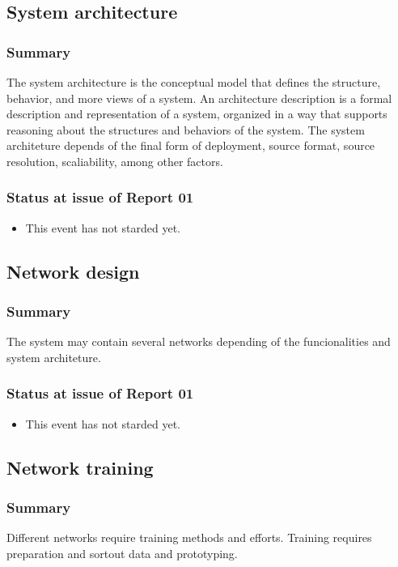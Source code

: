 \documentclass{article}
\begin{document}
\begin{enumerate}
\subsection{System architecture}
\label{sec:org6b2d595}
\subsubsection{Summary}
\label{sec:orgb7e5900}
The system architecture is the conceptual model that defines the structure, behavior, and more views of a system.
An architecture description is a formal description and representation of a system, organized in a way that supports reasoning about the structures and behaviors of the system.
The system architeture depends of the final form of deployment, source format, source resolution, scaliability, among other factors.

\subsubsection{Status at issue of Report 01}
\label{sec:org8da3270}
\begin{itemize}
\item This event has not starded yet.
\end{itemize}

\subsection{Network design}
\label{sec:org9cd97d3}
\subsubsection{Summary}
\label{sec:org281e258}
The system may contain several networks depending of the funcionalities and system architeture.

\subsubsection{Status at issue of Report 01}
\label{sec:orgaffab84}
\begin{itemize}
\item This event has not starded yet.
\end{itemize}

\subsection{Network training}
\label{sec:orgeadc035}
\subsubsection{Summary}
\label{sec:org9328728}
Different networks require training methods and efforts.
Training requires preparation and sortout data and prototyping.


\end{enumerate}
\end{document}
